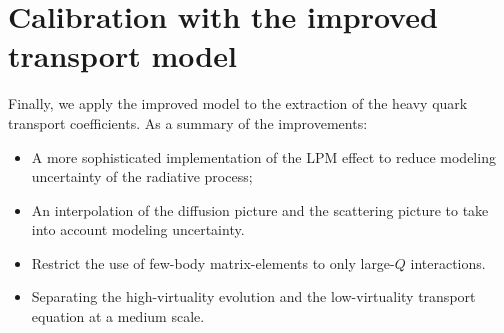\section{Calibration with the improved transport model}
Finally, we apply the improved model to the extraction of the heavy quark transport coefficients.
As a summary of the improvements:
\begin{itemize}
\item A more sophisticated implementation of the LPM effect to reduce modeling uncertainty of the radiative process;
\item An interpolation of the diffusion picture and the scattering picture to take into account modeling uncertainty.
\item Restrict the use of few-body matrix-elements to only large-$Q$ interactions.
\item Separating the high-virtuality evolution and the low-virtuality transport equation at a medium scale.
\end{itemize}

